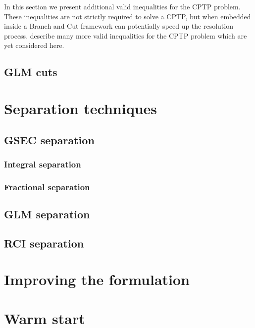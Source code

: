 In this section we present additional valid inequalities for the CPTP problem.
These inequalities are not strictly required to solve a CPTP, but when embedded inside a Branch and Cut framework can potentially speed up the resolution process.
\cite{Jepsen2014} describe many more valid inequalities for the CPTP problem which are yet considered here.

\subsection{GLM cuts}


\section{Separation techniques}

\subsection{GSEC separation}

\subsubsection{Integral separation}

\subsubsection{Fractional separation}

\subsection{GLM separation}

\subsection{RCI separation}

\section{Improving the formulation}

\section{Warm start}
